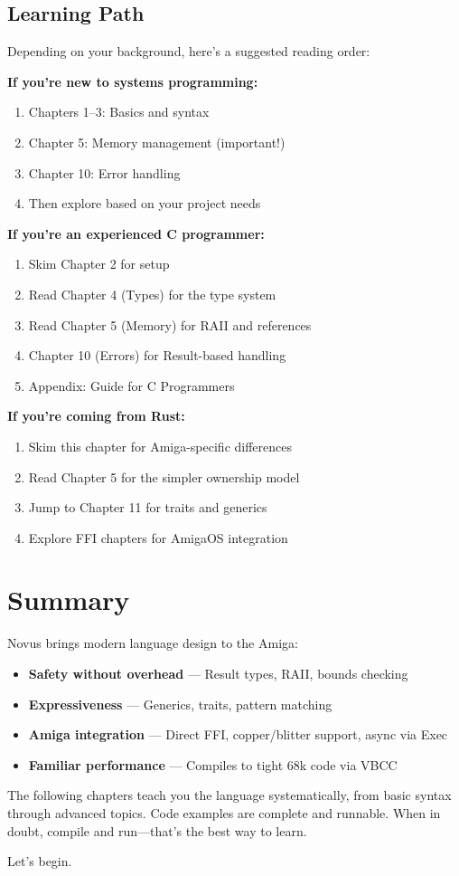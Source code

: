 \subsection{Learning Path}

Depending on your background, here's a suggested reading order:

\textbf{If you're new to systems programming:}
\begin{enumerate}
    \item Chapters 1--3: Basics and syntax
    \item Chapter 5: Memory management (important!)
    \item Chapter 10: Error handling
    \item Then explore based on your project needs
\end{enumerate}

\textbf{If you're an experienced C programmer:}
\begin{enumerate}
    \item Skim Chapter 2 for setup
    \item Read Chapter 4 (Types) for the type system
    \item Read Chapter 5 (Memory) for RAII and references
    \item Chapter 10 (Errors) for Result-based handling
    \item Appendix: Guide for C Programmers
\end{enumerate}

\textbf{If you're coming from Rust:}
\begin{enumerate}
    \item Skim this chapter for Amiga-specific differences
    \item Read Chapter 5 for the simpler ownership model
    \item Jump to Chapter 11 for traits and generics
    \item Explore FFI chapters for AmigaOS integration
\end{enumerate}

\section{Summary}
\label{sec:intro-summary}

Novus brings modern language design to the Amiga:

\begin{itemize}
    \item \textbf{Safety without overhead} --- Result types, RAII, bounds checking
    \item \textbf{Expressiveness} --- Generics, traits, pattern matching
    \item \textbf{Amiga integration} --- Direct FFI, copper/blitter support, async via Exec
    \item \textbf{Familiar performance} --- Compiles to tight 68k code via VBCC
\end{itemize}

The following chapters teach you the language systematically, from basic syntax through advanced topics. Code examples are complete and runnable. When in doubt, compile and run---that's the best way to learn.

Let's begin.
